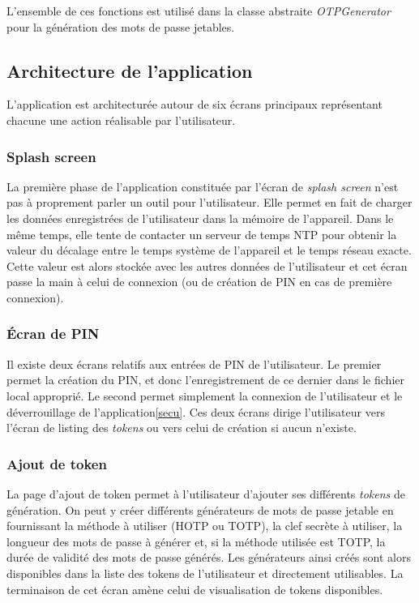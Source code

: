 L'ensemble de ces fonctions est utilisé dans la classe abstraite \emph{OTPGenerator} pour la
génération des mots de passe jetables.

\subsection{Architecture de l'application}

L'application est architecturée autour de six écrans principaux représentant chacune une 
action réalisable par l'utilisateur. 

\subsubsection{Splash screen}
La première phase de l'application constituée par l'écran de \emph{splash screen} n'est pas à 
proprement parler un outil pour l'utilisateur. Elle permet en fait de charger les données enregistrées
de l'utilisateur dans la mémoire de l'appareil. Dans le même temps, elle tente de contacter un serveur
de temps NTP pour obtenir la valeur du décalage entre le temps système de l'appareil et le temps réseau
exacte. Cette valeur est alors stockée avec les autres données de l'utilisateur et cet écran passe la
main à celui de connexion (ou de création de PIN en cas de première connexion).

\subsubsection{Écran de PIN}
Il existe deux écrans relatifs aux entrées de PIN de l'utilisateur. Le premier permet la création
du PIN, et donc l'enregistrement de ce dernier dans le fichier local approprié. Le second permet 
simplement la connexion de l'utilisateur et le déverrouillage de l'application\ref{secu}. Ces deux
écrans dirige l'utilisateur vers l'écran de listing des \emph{tokens} ou vers celui de création 
si aucun n'existe.

\subsubsection{Ajout de token}
La page d'ajout de token permet à l'utilisateur d'ajouter ses différents \emph{tokens} de
génération. On peut y créer différents générateurs de mots de passe jetable en fournissant la 
méthode à utiliser (HOTP ou TOTP), la clef secrète à utiliser, la longueur des mots de passe à
générer et, si la méthode utilisée est TOTP, la durée de validité des mots de passe générés. Les 
générateurs ainsi créés sont alors disponibles dans la liste des tokens de l'utilisateur et 
directement utilisables. La terminaison de cet écran amène celui de visualisation de tokens
disponibles.

